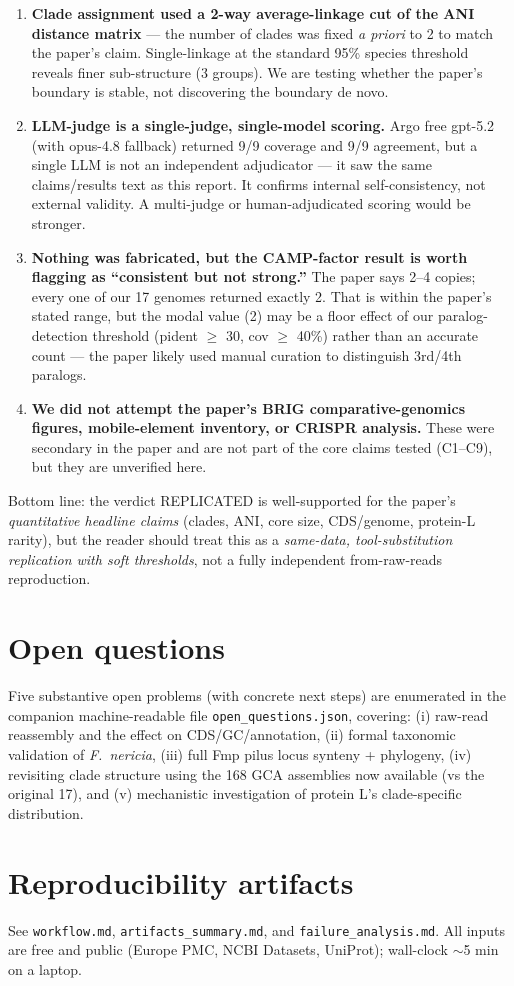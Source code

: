 \documentclass[11pt]{article}
\begin{document}
\begin{enumerate}
\item \textbf{Clade assignment used a 2-way average-linkage cut of the ANI distance matrix} --- the number of clades was fixed \emph{a priori} to 2 to match the paper's claim. Single-linkage at the standard 95\% species threshold reveals finer sub-structure (3 groups). We are testing whether the paper's boundary is stable, not discovering the boundary de novo.
\item \textbf{LLM-judge is a single-judge, single-model scoring.} Argo free gpt-5.2 (with opus-4.8 fallback) returned 9/9 coverage and 9/9 agreement, but a single LLM is not an independent adjudicator --- it saw the same claims/results text as this report. It confirms internal self-consistency, not external validity. A multi-judge or human-adjudicated scoring would be stronger.
\item \textbf{Nothing was fabricated, but the CAMP-factor result is worth flagging as ``consistent but not strong.''} The paper says 2--4 copies; every one of our 17 genomes returned exactly 2. That is within the paper's stated range, but the modal value (2) may be a floor effect of our paralog-detection threshold (pident $\geq$ 30, cov $\geq$ 40\%) rather than an accurate count --- the paper likely used manual curation to distinguish 3rd/4th paralogs.
\item \textbf{We did not attempt the paper's BRIG comparative-genomics figures, mobile-element inventory, or CRISPR analysis.} These were secondary in the paper and are not part of the core claims tested (C1--C9), but they are unverified here.
\end{enumerate}

Bottom line: the verdict REPLICATED is well-supported for the paper's \emph{quantitative headline claims} (clades, ANI, core size, CDS/genome, protein-L rarity), but the reader should treat this as a \emph{same-data, tool-substitution replication with soft thresholds}, not a fully independent from-raw-reads reproduction.

\section{Open questions}
Five substantive open problems (with concrete next steps) are enumerated in the companion machine-readable file \texttt{open\_questions.json}, covering: (i) raw-read reassembly and the effect on CDS/GC/annotation, (ii) formal taxonomic validation of \emph{F.\ nericia}, (iii) full Fmp pilus locus synteny + phylogeny, (iv) revisiting clade structure using the 168 GCA assemblies now available (vs the original 17), and (v) mechanistic investigation of protein L's clade-specific distribution.

\section{Reproducibility artifacts}
See \texttt{workflow.md}, \texttt{artifacts\_summary.md}, and \texttt{failure\_analysis.md}. All inputs are free and public (Europe PMC, NCBI Datasets, UniProt); wall-clock $\sim$5 min on a laptop.
\end{document}
